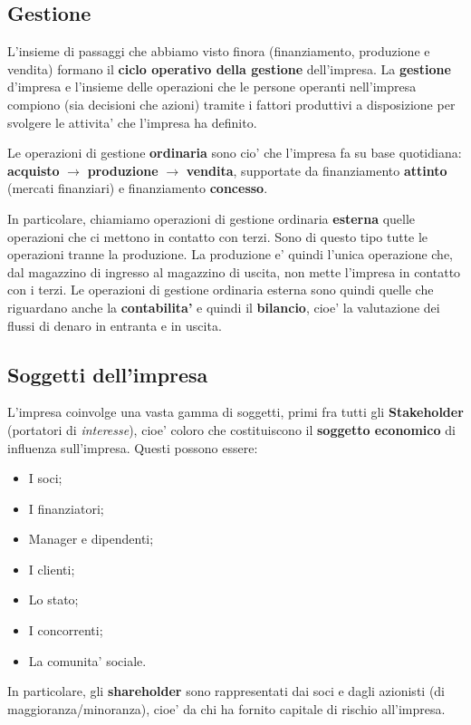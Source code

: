 \documentclass[a4paper,11pt]{article}
\begin{document}
\subsection{Gestione}
L'insieme di passaggi che abbiamo visto finora (finanziamento, produzione e vendita) formano il \textbf{ciclo operativo della gestione} dell'impresa.
La \textbf{gestione} d'impresa e l'insieme delle operazioni che le persone operanti nell'impresa compiono (sia decisioni che azioni) tramite i fattori produttivi a disposizione per svolgere le attivita' che l'impresa ha definito.

Le operazioni di gestione \textbf{ordinaria} sono cio' che l'impresa fa su base quotidiana: \textbf{acquisto} $\rightarrow$ \textbf{produzione} $\rightarrow$ \textbf{vendita}, supportate da finanziamento \textbf{attinto} (mercati finanziari) e finanziamento \textbf{concesso}.

In particolare, chiamiamo operazioni di gestione ordinaria \textbf{esterna} quelle operazioni che ci mettono in contatto con terzi.
Sono di questo tipo tutte le operazioni tranne la produzione.
La produzione e' quindi l'unica operazione che, dal magazzino di ingresso al magazzino di uscita, non mette l'impresa in contatto con i terzi.
Le operazioni di gestione ordinaria esterna sono quindi quelle che riguardano anche la \textbf{contabilita'} e quindi il \textbf{bilancio}, cioe' la valutazione dei flussi di denaro in entranta e in uscita.

\subsection{Soggetti dell'impresa}
L'impresa coinvolge una vasta gamma di soggetti, primi fra tutti gli \textbf{Stakeholder} (portatori di \textit{interesse}), cioe' coloro che costituiscono il \textbf{soggetto economico} di influenza sull'impresa.
Questi possono essere:
\begin{itemize}
	\item I soci;
	\item I finanziatori;
	\item Manager e dipendenti;
	\item I clienti;
	\item Lo stato;
	\item I concorrenti;
	\item La comunita' sociale.
\end{itemize}

In particolare, gli \textbf{shareholder} sono rappresentati dai soci e dagli azionisti (di maggioranza/minoranza), cioe' da chi ha fornito capitale di rischio all'impresa.
\end{document}
